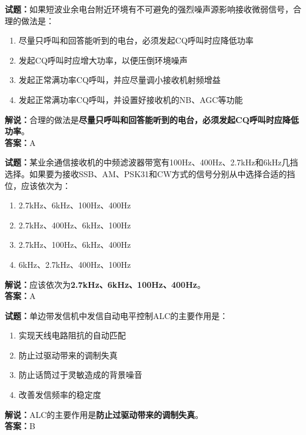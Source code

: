 \documentclass{ctexbook}
\begin{document}
\bigskip


\noindent\textbf{试题：}如果短波业余电台附近环境有不可避免的强烈噪声源影响接收微弱信号，合理的做法是：
\begin{enumerate}[leftmargin=3em]
\item 尽量只呼叫和回答能听到的电台，必须发起CQ呼叫时应降低功率
\item 发起CQ呼叫时应增大功率，以便压倒环境噪声
\item 发起正常满功率CQ呼叫，并应尽量调小接收机射频增益
\item 发起正常满功率CQ呼叫，并设置好接收机的NB、AGC等功能
\end{enumerate}
\noindent\textbf{解说：}合理的做法是\textbf{尽量只呼叫和回答能听到的电台，必须发起CQ呼叫时应降低功率}。\\\noindent\textbf{答案：}A




\bigskip


\noindent\textbf{试题：}某业余通信接收机的中频滤波器带宽有100Hz、400Hz、2.7kHz和6kHz几挡选择。如果要为接收SSB、AM、PSK31和CW方式的信号分别从中选择合适的挡位，应该依次为：
\begin{enumerate}[leftmargin=3em]
\item 2.7kHz、6kHz、100Hz、400Hz
\item 2.7kHz、400Hz、6kHz、100Hz
\item 2.7kHz、100Hz、6kHz、400Hz
\item 6kHz、2.7kHz、400Hz、100Hz
\end{enumerate}
\noindent\textbf{解说：}应该依次为\textbf{2.7kHz、6kHz、100Hz、400Hz}。\\\noindent\textbf{答案：}A




\bigskip


\noindent\textbf{试题：}单边带发信机中发信自动电平控制ALC的主要作用是：
\begin{enumerate}[leftmargin=3em]
\item 实现天线电路阻抗的自动匹配
\item 防止过驱动带来的调制失真
\item 防止话筒过于灵敏造成的背景噪音
\item 改善发信频率的稳定度
\end{enumerate}
\noindent\textbf{解说：}ALC的主要作用是\textbf{防止过驱动带来的调制失真}。\\\noindent\textbf{答案：}B




\bigskip
\end{document}
